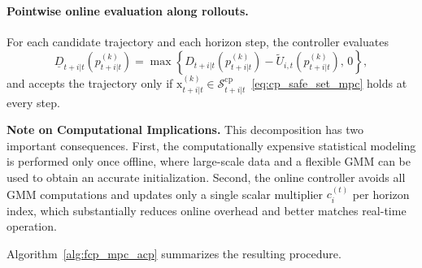 \documentclass[lettersize,journal]{IEEEtran}
\begin{document}
\paragraph{Pointwise online evaluation along rollouts.}
For each candidate trajectory and each horizon step, the controller evaluates
\[
\underline D_{t+i|t}\!\left(p^{(k)}_{t+i|t}\right)
=
\max\!\left\{
D_{t+i|t}\!\left(p^{(k)}_{t+i|t}\right)
-
\widetilde U_{i,t}\!\left(p^{(k)}_{t+i|t}\right),
\,0
\right\},
\]
and accepts the trajectory only if $\mathrm{x}^{(k)}_{t+i|t}\in\mathcal S^{\mathrm{cp}}_{t+i|t}$~\eqref{eq:cp_safe_set_mpc} holds at every step.

\noindent
{\bf Note on Computational Implications.}
This decomposition has two important consequences.
First, the computationally expensive statistical modeling is performed only once offline, where large-scale data and a flexible GMM can be used to obtain an accurate initialization.
Second, the online controller avoids all GMM computations and updates only a single scalar multiplier $c_i^{(t)}$ per horizon index, which substantially reduces online overhead and better matches real-time operation.

Algorithm~\ref{alg:fcp_mpc_acp} summarizes the resulting procedure.
\end{document}
